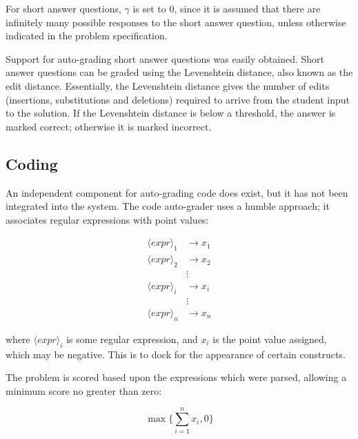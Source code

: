 For short answer questions, $\gamma$ is set to 0, since it is assumed that
there are infinitely many possible responses to the short answer question,
unless otherwise indicated in the problem specification. 

Support for auto-grading short answer questions was easily obtained.  Short
answer questions can be graded using the Levenshtein distance, also known as
the edit distance.  Essentially, the Levenshtein distance gives the number of
edits (insertions, substitutions and deletions) required to arrive from the
student input to the solution.  If the Levenshtein distance is below a
threshold, the answer is marked correct; otherwise it is marked incorrect. 

\subsection{Coding}

An independent component for auto-grading code does exist, but it has not been
integrated into the system.  The code auto-grader uses a humble approach; it
associates regular expressions with point values:

 \begin{align*}
  \langle expr \rangle_1 & \rightarrow  x_1 \\
  \langle expr \rangle_2 & \rightarrow  x_2 \\
                         & \vdots       \\
  \langle expr \rangle_i & \rightarrow  x_i \\
                         & \vdots       \\
  \langle expr \rangle_n & \rightarrow  x_n 
 \end{align*}

where $\langle expr \rangle_i$ is some regular expression, and $x_i$ is the
point value assigned, which may be negative.  This is to dock for the
appearance of certain constructs.

The problem is scored based upon the expressions which were parsed, allowing
a minimum score no greater than zero:

\begin{equation}
  \max \Bigg\{ \displaystyle\sum_{i=1}^n x_i, 0 \Bigg\}
\end{equation}


